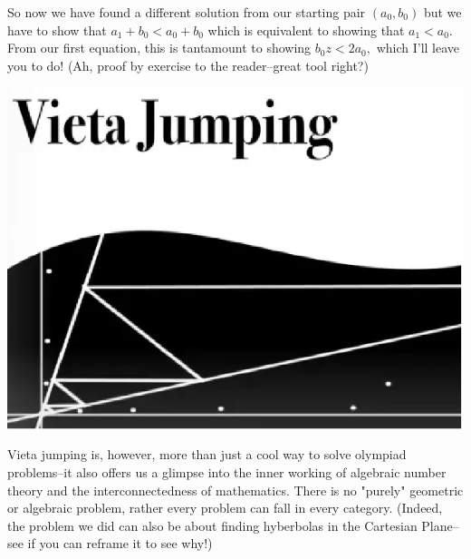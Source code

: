 \documentclass{article}
\begin{document}
So now we have found a different solution from our starting pair $(a_0,b_0)$ but we have to show that $a_1+b_0 < a_0+b_0$ which is equivalent to showing that $a_1<a_0.$ From our first equation, this is tantamount to showing $b_0z<2a_0,$ which I'll leave you to do! (Ah, proof by exercise to the reader--great tool right?)

\begin{center}
\includegraphics[scale=0.5]{images/vieta_jumping.png}
\end{center}

Vieta jumping is, however, more than just a cool way to solve olympiad problems--it also offers us a glimpse into the inner working of algebraic number theory and the interconnectedness of mathematics. There is no "purely" geometric or algebraic problem, rather every problem can fall in every category. (Indeed, the problem we did can also be about finding hyberbolas in the Cartesian Plane--see if you can reframe it to see why!)
\end{document}

